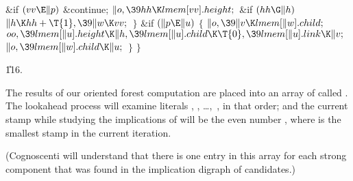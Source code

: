 \&{if} ${}(\\{vv}\E\|p){}$\1\5
\&{continue};\2\6
${}\|o,\39\\{hh}\K\\{lmem}[\\{vv}].\\{height};{}$\6
\&{if} ${}(\\{hh}\G\|h){}$\1\5
${}\|h\K\\{hh}+\T{1},\39\|w\K\\{vv};{}$\2\6
\4${}\}{}$\2\6
\&{if} ${}(\|p\E\|u){}$\5
${}\{{}$\1\6
${}\|o,\39\|v\K\\{lmem}[\|w].\\{child};{}$\6
${}\\{oo},\39\\{lmem}[\|u].\\{height}\K\|h,\39\\{lmem}[\|u].\\{child}\K\T{0},%
\39\\{lmem}[\|u].\\{link}\K\|v;{}$\6
${}\|o,\39\\{lmem}[\|w].\\{child}\K\|u;{}$\6
\4${}\}{}$\2\6
\4${}\}{}$\2\par
\U116.\fi

The results of our oriented forest computation are placed
into
an array of  called .
The lookahead process will
examine literals , ,
\dots,~,
in that order; and the current stamp while studying the implications
of  will be the even number , where
 is the smallest stamp in the current iteration.

(Cognoscenti will understand that there is one entry in this array
for each strong component that was found in the implication digraph
of candidates.)

